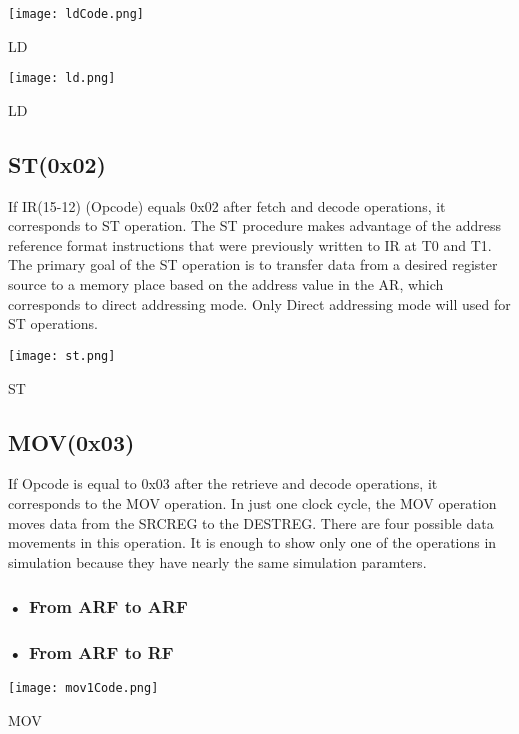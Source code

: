\documentclass[pdftex,12pt,a4paper]{article}
\begin{document}
\begin{figure5}
	\centering
	\texttt{[image: ldCode.png]}	
	\caption{LD}
	\label{fig1}
\end{figure5}


\begin{figure6}
	\centering
	\texttt{[image: ld.png]}	
	\caption{LD}
	\label{fig1}
\end{figure6}



\subsection{ST(0x02)}
If IR(15-12) (Opcode) equals 0x02 after fetch and decode operations, it corresponds to ST operation. The ST procedure makes advantage of the address reference format instructions that were previously written to IR at T0 and T1. The primary goal of the ST operation is to transfer data from a desired register source to a memory place based on the address value in the AR, which corresponds to direct addressing mode. Only Direct addressing mode will used for ST operations.



\begin{figure7}
	\centering
	\texttt{[image: st.png]}	
	\caption{ST}
	\label{fig1}
\end{figure7}



\subsection{MOV(0x03)}
If Opcode is equal to 0x03 after the retrieve and decode operations, it corresponds to the MOV operation. In just one clock cycle, the MOV operation moves data from the SRCREG to the DESTREG. There are four possible data movements in this operation. It is enough to show only one of the operations in simulation
because they have nearly the same simulation paramters.


\subsubsection{• From ARF to ARF}
\subsubsection{• From ARF to RF}

\begin{figure20}
	\centering
	\texttt{[image: mov1Code.png]}	
	\caption{MOV}
	\label{fig1}
\end{figure20}
\end{document}
